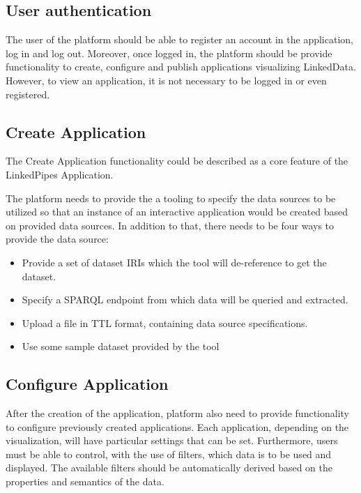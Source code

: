 \subsection{User authentication}

The user of the platform should be able to register an account in the application, log in and log out. Moreover, once logged in, the platform should be provide functionality to create, configure and publish applications visualizing LinkedData. However, to view an application, it is not necessary to be logged in or even registered.

\subsection{Create Application}

The Create Application functionality could be described as a core feature of the LinkedPipes Application.

The platform needs to provide the a tooling to specify the data sources to be utilized so that an instance of an interactive application would be created based on provided data sources. In addition to that, there needs to be four ways to provide the data source:

\begin{itemize}
\item Provide a set of dataset \acrshort{IRI}s which the tool will de-reference to get the dataset.
\item Specify a \acrshort{SPARQL} endpoint from which data will be queried and extracted.
\item Upload a file in \acrshort{TTL} format, containing data source specifications.
\item Use some sample dataset provided by the tool
\end{itemize}

\subsection{Configure Application}

After the creation of the application, platform also need to provide functionality to configure previously created applications. Each application, depending on the visualization, will have particular settings that can be set. Furthermore, users must be able to control, with the use of filters, which data is to be used and displayed. The available filters should be automatically derived based on the properties and semantics of the data. 

